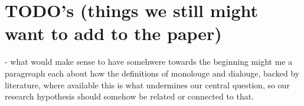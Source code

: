 \documentclass[11pt]{article}
\begin{document}
\section{TODO's (things we still might want to add to the paper)}
\label{app:todo}

- what would make sense to have somehwere towards the beginning might me a paragreaph
each about how the definitions of monolouge and dialouge, backed by literature, where available
this is what undermines our central question, so our research hypothesis should somehow be related
or connected to that. 
\end{document}
